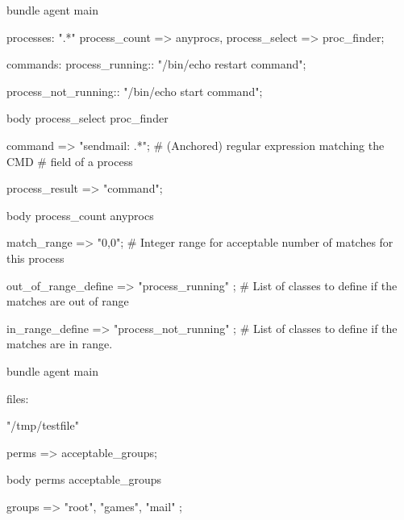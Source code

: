 \begin{codelisting}
\begin{code}
bundle agent main
{
  processes:
      ".*"
        process_count   => anyprocs,
        process_select  => proc_finder;


  commands:
    process_running::
      "/bin/echo restart command";

    process_not_running::
      "/bin/echo start command";
}

body process_select proc_finder
{

        command => "sendmail: .*";
        # (Anchored) regular expression matching the CMD
        # field of a process

        process_result => "command";

}


body process_count anyprocs
{
        match_range => "0,0";
        # Integer range for acceptable number of matches for this process

        out_of_range_define => { "process_running" };
        # List of classes to define if the matches are out of range

        in_range_define => { "process_not_running" };
        # List of classes to define if the matches are in range.

}
\end{code}
\end{codelisting}
\begin{codelisting}
\begin{code}
bundle agent main {

  files:

      "/tmp/testfile"

        perms => acceptable_groups;
}

body perms acceptable_groups {

        groups => {"root", "games", "mail" };

}
\end{code}
\end{codelisting}
\begin{codelisting}
\end{codelisting}





